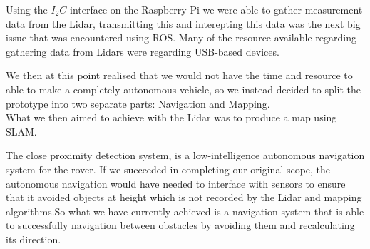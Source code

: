 Using the $I_2C$ interface on the Raspberry Pi we were able to gather measurement data from the Lidar, transmitting this and interepting this data was the next big issue that was encountered using ROS. Many of the resource available regarding gathering data from Lidars were regarding USB-based devices. %


We then at this point realised that we would not have the time and resource to able to make a completely autonomous vehicle, so we instead decided to split the prototype into two separate parts: Navigation and Mapping.\\
What we then aimed to achieve with the Lidar was to produce a map using SLAM. %

The close proximity detection system, is a low-intelligence autonomous navigation system for the rover. If we succeeded in completing our original scope, the autonomous navigation would have needed to interface with sensors to ensure that it avoided objects at height which is not recorded by the Lidar and mapping algorithms.So what we have currently achieved is a navigation system that is able to successfully navigation between obstacles by avoiding them and recalculating its direction.\\

